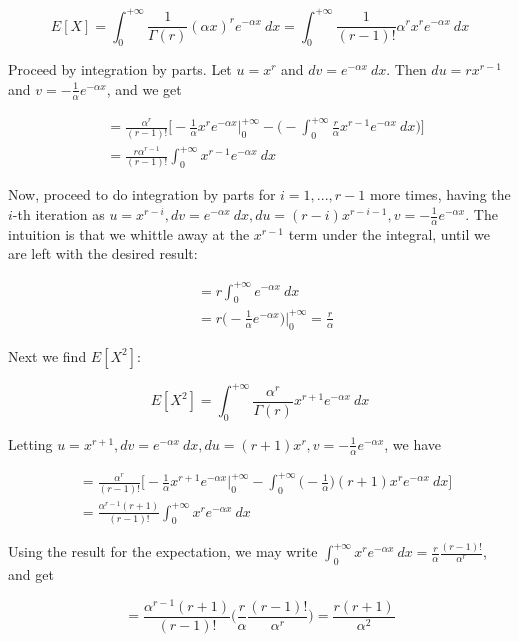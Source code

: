 \documentclass[10pt, oneside]{article}
\begin{document}
\begin{enumerate}[label=9.\arabic*]
\[ E[X] = \int^{+\infty}_0 \frac{1}{\Gamma(r)} (\alpha x)^r e^{-\alpha x} \ dx = \int^{+\infty}_0 \frac{1}{(r-1)!} \alpha^r x^r e^{-\alpha x} \ dx \]

Proceed by integration by parts. Let $u = x^r$ and $dv = e^{-\alpha x} \ dx$. Then $du = rx^{r-1}$ and $v = -\frac{1}{\alpha} e^{-\alpha x}$, and we get

\begin{align*}
&= \frac{\alpha^r}{(r-1)!} \bigg[ -\frac{1}{\alpha} x^r e^{-\alpha x} \bigg|^{+\infty}_0 - \bigg( - \int^{+\infty}_0 \frac{r}{\alpha} x^{r-1} e^{-\alpha x} \ dx \bigg) \bigg] \\
&= \frac{r \alpha^{r-1}}{(r-1)!} \int^{+\infty}_0 x^{r-1} e^{-\alpha x} \ dx
\end{align*}

Now, proceed to do integration by parts for $i = 1, ..., r-1$ more times, having the $i$-th iteration as $u = x^{r-i}, dv = e^{-\alpha x} \ dx, du = (r-i)x^{r-i-1}, v = -\frac{1}{\alpha} e^{-\alpha x}$. The intuition is that we whittle away at the $x^{r-1}$ term under the integral, until we are left with the desired result:

\begin{align*}
&= r\int^{+\infty}_0 e^{-\alpha x} \ dx \\
&= r \bigg( -\frac{1}{\alpha} e^{-\alpha x} \bigg) \bigg|^{+\infty}_0 = \boxed{\frac{r}{\alpha}}
\end{align*}

Next we find $E[X^2]$:

\[ E[X^2] = \int^{+\infty}_0 \frac{\alpha^r}{\Gamma(r)} x^{r+1} e^{-\alpha x} \ dx \]

Letting $u = x^{r+1}, dv = e^{-\alpha x} \ dx, du = (r+1) x^r, v = -\frac{1}{\alpha} e^{-\alpha x}$, we have

\begin{align*}
&= \frac{\alpha^r}{(r-1)!} \bigg[ -\frac{1}{\alpha} x^{r+1} e^{-\alpha x} \bigg|^{+\infty}_0 - \int^{+\infty}_0 \bigg( -\frac{1}{\alpha} \bigg) (r+1) x^r e^{-\alpha x} \ dx \bigg] \\
&= \frac{\alpha^{r-1} (r+1)}{(r-1)!} \int^{+\infty}_0 x^r e^{-\alpha x} \ dx
\end{align*}

Using the result for the expectation, we may write $\int^{+\infty}_0 x^r e^{-\alpha x} \ dx = \frac{r}{\alpha} \frac{(r-1)!}{\alpha^r}$, and get

\[ = \frac{\alpha^{r-1} (r+1)}{(r-1)!} \bigg( \frac{r}{\alpha} \frac{(r-1)!}{\alpha^r} \bigg) = \frac{r(r+1)}{\alpha^2} \]


\end{enumerate}
\end{document}
